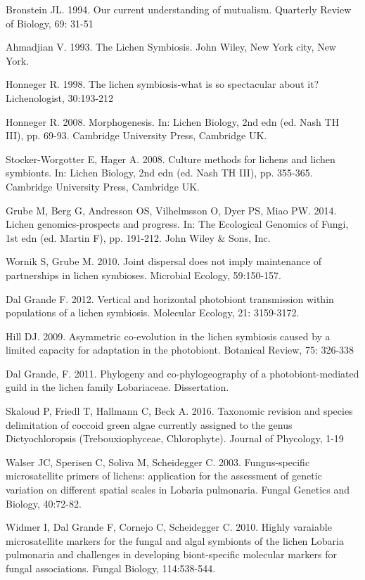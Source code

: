 \documentclass[runningheads,a4paper]{llncs}
\begin{document}
Bronstein JL. 1994. Our current understanding of mutualism. Quarterly Review of Biology, 69: 31-51

Ahmadjian V. 1993. The Lichen Symbiosis. John Wiley, New York city, New York.

Honneger R. 1998. The lichen symbiosis-what is so spectacular about it? Lichenologist, 30:193-212

Honneger R. 2008. Morphogenesis. In: Lichen Biology, 2nd edn (ed. Nash TH III), pp. 69-93. Cambridge University Press, Cambridge UK.

Stocker-Worgotter E, Hager A. 2008. Culture methods for lichens and lichen symbionts. In: Lichen Biology, 2nd edn (ed. Nash TH III), pp. 355-365. Cambridge University Press, Cambridge UK.

Grube M, Berg G, Andresson OS, Vilhelmsson O, Dyer PS, Miao PW. 2014. Lichen genomics-prospects and progress. In: The Ecological Genomics of Fungi, 1st edn (ed. Martin F), pp. 191-212. John Wiley \& Sons, Inc. 

Wornik S, Grube M. 2010. Joint dispersal does not imply maintenance of partnerships in lichen symbioses. Microbial Ecology, 59:150-157. 

Dal Grande F. 2012. Vertical and horizontal photobiont transmission within populations of a lichen symbiosis. Molecular Ecology, 21: 3159-3172.

Hill DJ. 2009. Asymmetric co-evolution in the lichen symbiosis caused by a limited capacity for adaptation in the photobiont. Botanical Review, 75: 326-338

Dal Grande, F. 2011. Phylogeny and co-phylogeography of a photobiont-mediated guild in the lichen family Lobariaceae. Dissertation. 

Skaloud P, Friedl T, Hallmann C, Beck A. 2016. Taxonomic revision and species delimitation of coccoid green algae currently assigned to the genus Dictyochloropsis (Trebouxiophyceae, Chlorophyte). Journal of Phycology, 1-19

Walser JC, Sperisen C, Soliva M, Scheidegger C. 2003. Fungus-specific microsatellite primers of lichens: application for the assessment of genetic variation on different spatial scales in Lobaria pulmonaria. Fungal Genetics and 
Biology, 40:72-82. 

Widmer I, Dal Grande F, Cornejo C, Scheidegger C. 2010. Highly varaiable microsatellite markers for the fungal and algal symbionts of the lichen Lobaria pulmonaria and challenges in developing biont-specific molecular markers for 
fungal associations. Fungal Biology, 114:538-544. 
\end{document}
